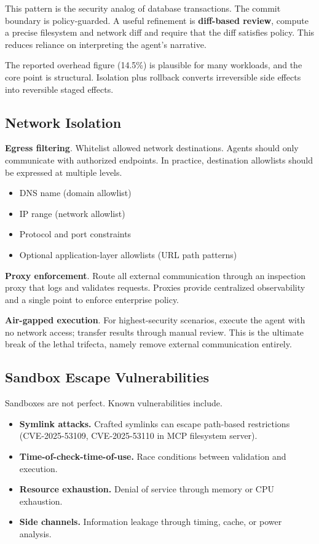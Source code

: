 This pattern is the security analog of database transactions. The commit boundary is policy-guarded. A useful refinement is \textbf{diff-based review}, compute a precise filesystem and network diff and require that the diff satisfies policy. This reduces reliance on interpreting the agent's narrative.

The reported overhead figure (14.5\%) is plausible for many workloads, and the core point is structural. Isolation plus rollback converts irreversible side effects into reversible staged effects.

\subsection{Network Isolation}

\textbf{Egress filtering}. Whitelist allowed network destinations. Agents should only communicate with authorized endpoints. In practice, destination allowlists should be expressed at multiple levels.
\begin{itemize}
\item DNS name (domain allowlist)
\item IP range (network allowlist)
\item Protocol and port constraints
\item Optional application-layer allowlists (URL path patterns)
\end{itemize}

\textbf{Proxy enforcement}. Route all external communication through an inspection proxy that logs and validates requests. Proxies provide centralized observability and a single point to enforce enterprise policy.

\textbf{Air-gapped execution}. For highest-security scenarios, execute the agent with no network access; transfer results through manual review. This is the ultimate break of the lethal trifecta, namely remove external communication entirely.

\subsection{Sandbox Escape Vulnerabilities}

Sandboxes are not perfect. Known vulnerabilities include.
\begin{itemize}
\item \textbf{Symlink attacks.} Crafted symlinks can escape path-based restrictions (CVE-2025-53109, CVE-2025-53110 in MCP filesystem server).
\item \textbf{Time-of-check-time-of-use.} Race conditions between validation and execution.
\item \textbf{Resource exhaustion.} Denial of service through memory or CPU exhaustion.
\item \textbf{Side channels.} Information leakage through timing, cache, or power analysis.
\end{itemize}

